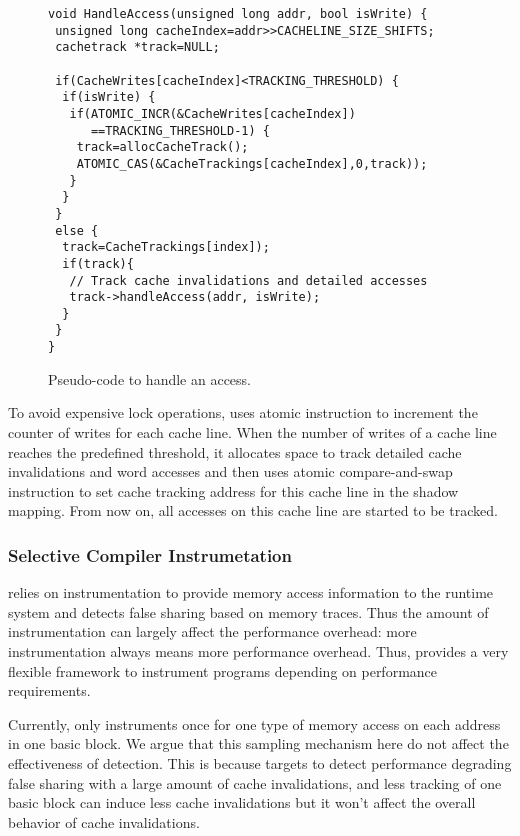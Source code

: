 \begin{figure}[!t]
\begin{lstlisting}
void HandleAccess(unsigned long addr, bool isWrite) {
 unsigned long cacheIndex=addr>>CACHELINE_SIZE_SHIFTS;
 cachetrack *track=NULL;

 if(CacheWrites[cacheIndex]<TRACKING_THRESHOLD) {
  if(isWrite) {
   if(ATOMIC_INCR(&CacheWrites[cacheIndex]) 
      ==TRACKING_THRESHOLD-1) {
    track=allocCacheTrack();
    ATOMIC_CAS(&CacheTrackings[cacheIndex],0,track));
   }
  } 
 }
 else {
  track=CacheTrackings[index]);
  if(track){
   // Track cache invalidations and detailed accesses
   track->handleAccess(addr, isWrite);
  }
 }
}
\end{lstlisting}
\caption{Pseudo-code to handle an access.\label{fig:algorithm}}
\end{figure}

To avoid expensive lock operations,  uses atomic instruction to increment 
the counter of writes for each cache line. 
When the number of writes of a cache line reaches the predefined threshold,
it allocates space to track detailed cache invalidations and word accesses and then 
uses atomic compare-and-swap instruction to set cache tracking address for this cache line in
the shadow mapping. From now on, all accesses on this cache line are started to be tracked.

\subsubsection{Selective Compiler Instrumetation}
 relies on instrumentation to provide memory access information to the runtime system 
and detects false sharing based on memory traces. 
Thus the amount of instrumentation can largely affect the performance overhead: more 
instrumentation always means more performance overhead. 
Thus,  provides a very flexible framework to instrument programs depending on performance requirements. 

Currently, \Defaults{} only instruments once for one type of memory access on each address 
in one basic block. 
We argue that this sampling mechanism here do not affect the effectiveness of detection. 
This is because \Defaults{} targets to detect performance degrading false sharing with a large amount of cache invalidations,
and less tracking of one basic block can induce less cache invalidations but it won't affect the overall behavior of cache invalidations. 

